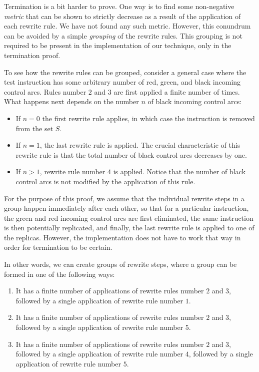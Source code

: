 Termination is a bit harder to prove.  One way is to find some
non-negative \emph{metric} that can be shown to strictly decrease as a
result of the application of each rewrite rule.  We have not found any
such metric.  However, this conundrum can be avoided by a simple
\emph{grouping} of the rewrite rules.  This grouping is not required
to be present in the implementation of our technique, only in the
termination proof.

To see how the rewrite rules can be grouped, consider a general case
where the test instruction has some arbitrary number of red, green,
and black incoming control arcs.  Rules number $2$ and $3$ are first
applied a finite number of times.  What happens next depends on the
number $n$ of black incoming control arcs:

\begin{itemize}
\item If $n=0$ the first rewrite
rule applies, in which case the instruction is removed from the set
$S$.
\item If $n=1$, the last rewrite rule is applied.  The crucial
  characteristic of this rewrite rule is that the total number of
  black control arcs decreases by one.
\item If $n>1$, rewrite rule number $4$ is applied.  Notice that the
  number of black control arcs is not modified by the application of
  this rule.
\end{itemize}

For the purpose of this proof, we assume that the individual rewrite
steps in a group happen immediately after each other, so that for a
particular instruction, the green and red incoming control arcs are
first eliminated, the same instruction is then potentially replicated,
and finally, the last rewrite rule is applied to one of the replicas.
However, the implementation does not have to work that way in order
for termination to be certain.

In other words, we can create groups of rewrite steps, where a group
can be formed in one of the following ways:

\begin{enumerate}
\item It has a finite number of applications of rewrite rules number
  $2$ and $3$, followed by a single application of rewrite rule number
  $1$.
\item It has a finite number of applications of rewrite rules number
  $2$ and $3$, followed by a single application of rewrite rule number
  $5$.
\item It has a finite number of applications of rewrite rules number
  $2$ and $3$, followed by a single application of rewrite rule number
  $4$, followed by a single application of rewrite rule number $5$.
\end{enumerate}

